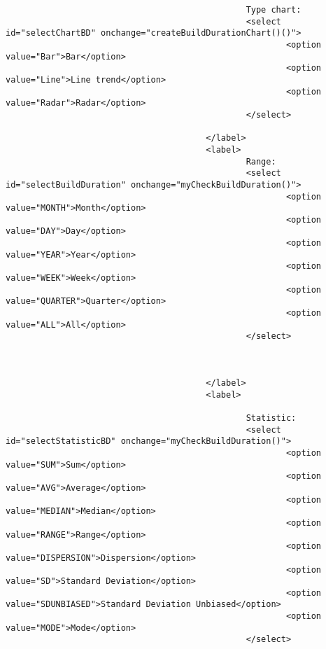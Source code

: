 \begin{lstlisting}
                                                Type chart:
                                                <select id="selectChartBD" onchange="createBuildDurationChart()()">
                                                        <option value="Bar">Bar</option>
                                                        <option value="Line">Line trend</option>
                                                        <option value="Radar">Radar</option>
                                                </select>

                                        </label>
                                        <label>
                                                Range:
                                                <select id="selectBuildDuration" onchange="myCheckBuildDuration()">
                                                        <option value="MONTH">Month</option>
                                                        <option value="DAY">Day</option>
                                                        <option value="YEAR">Year</option>
                                                        <option value="WEEK">Week</option>
                                                        <option value="QUARTER">Quarter</option>
                                                        <option value="ALL">All</option>
                                                </select>



                                        </label>
                                        <label>

                                                Statistic:
                                                <select id="selectStatisticBD" onchange="myCheckBuildDuration()">
                                                        <option value="SUM">Sum</option>
                                                        <option value="AVG">Average</option>
                                                        <option value="MEDIAN">Median</option>
                                                        <option value="RANGE">Range</option>
                                                        <option value="DISPERSION">Dispersion</option>
                                                        <option value="SD">Standard Deviation</option>
                                                        <option value="SDUNBIASED">Standard Deviation Unbiased</option>
                                                        <option value="MODE">Mode</option>
                                                </select>


\end{lstlisting}
